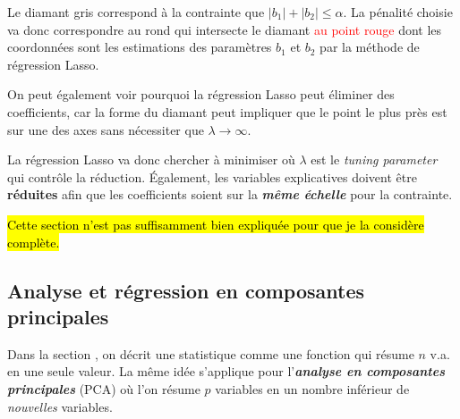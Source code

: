 \documentclass[french]{article}
\begin{document}
\begin{multicols*}{2}
\begin{definitionNOHFILL}
\begin{definitionNOHFILLsub}[Visualisation pour $p = 2$]
\begin{center}
\end{center}

\textcolor{ashgrey!80!black}{Le diamant gris} correspond à la contrainte que $|b_{1}| + |b_{2}| \leq \alpha$. La pénalité choisie va donc correspondre au rond qui intersecte le diamant \textcolor{red}{au point rouge} dont les coordonnées sont les estimations des paramètres $b_{1}$ et $b_{2}$ par la méthode de régression Lasso. 

\bigskip

On peut également voir pourquoi la régression Lasso peut éliminer des coefficients, car la forme du diamant peut impliquer que le point le plus près est sur une des axes sans nécessiter que $\lambda \rightarrow \infty$. 
\end{definitionNOHFILLsub}

La régression Lasso va donc chercher à minimiser  où $\lambda$ est le \og \textit{tuning parameter} \fg{} qui contrôle la réduction. Également, les variables explicatives doivent être \textbf{réduites} afin que les coefficients soient sur la \textbf{\textit{même échelle}} pour la contrainte.
\end{definitionNOHFILL}



\columnbreak
\hl{Cette section n'est pas suffisamment bien expliquée pour que je la considère complète.}

\subsection{Analyse et régression en composantes principales}
\begin{rappel_enhanced}[Contexte]
Dans la section \textit{\underline{}}, on décrit une statistique comme une fonction qui résume $n$ v.a. en une seule valeur. La même idée s'applique pour l'\textbf{\textit{analyse en composantes principales}} (PCA) où l'on résume $p$ variables en un nombre inférieur de \textit{nouvelles} variables.


\end{rappel_enhanced}
\end{multicols*}
\end{document}
